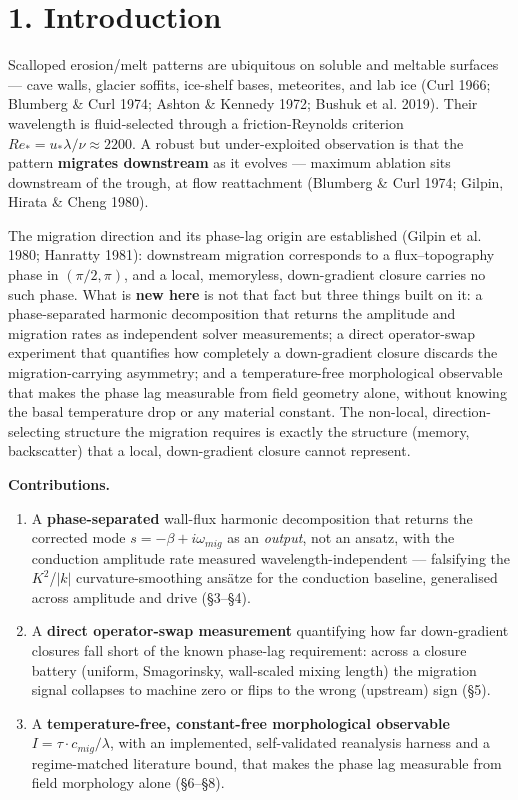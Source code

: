 \documentclass[11pt]{article}
\begin{document}
\begin{abstract}
\end{abstract}


\section*{1. Introduction}


Scalloped erosion/melt patterns are ubiquitous on soluble and meltable surfaces — cave walls, glacier soffits, ice-shelf bases, meteorites, and lab ice (Curl 1966; Blumberg \& Curl 1974; Ashton \& Kennedy 1972; Bushuk et al. 2019). Their wavelength is fluid-selected through a friction-Reynolds criterion $Re_*=u_*\lambda /\nu \approx 2200$. A robust but under-exploited observation is that the pattern \textbf{migrates downstream} as it evolves — maximum ablation sits downstream of the trough, at flow reattachment (Blumberg \& Curl 1974; Gilpin, Hirata \& Cheng 1980).


The migration direction and its phase-lag origin are established (Gilpin et al. 1980; Hanratty 1981): downstream migration corresponds to a flux–topography phase in $(\pi /2,\pi )$, and a local, memoryless, down-gradient closure carries no such phase. What is \textbf{new here} is not that fact but three things built on it: a phase-separated harmonic decomposition that returns the amplitude and migration rates as independent solver measurements; a direct operator-swap experiment that quantifies how completely a down-gradient closure discards the migration-carrying asymmetry; and a temperature-free morphological observable that makes the phase lag measurable from field geometry alone, without knowing the basal temperature drop or any material constant. The non-local, direction-selecting structure the migration requires is exactly the structure (memory, backscatter) that a local, down-gradient closure cannot represent.


\textbf{Contributions.}

\begin{enumerate}
\item A \textbf{phase-separated} wall-flux harmonic decomposition that returns the corrected mode $s=-\beta +i\omega _{mig}$ as an \emph{output}, not an ansatz, with the conduction amplitude rate measured wavelength-independent — falsifying the $K^{2}$/$|k|$ curvature-smoothing ansätze for the conduction baseline, generalised across amplitude and drive (§3–§4).
\item A \textbf{direct operator-swap measurement} quantifying how far down-gradient closures fall short of the known phase-lag requirement: across a closure battery (uniform, Smagorinsky, wall-scaled mixing length) the migration signal collapses to machine zero or flips to the wrong (upstream) sign (§5).
\item A \textbf{temperature-free, constant-free morphological observable} $I=\tau \cdot c_{mig}/\lambda $, with an implemented, self-validated reanalysis harness and a regime-matched literature bound, that makes the phase lag measurable from field morphology alone (§6–§8).
\end{enumerate}
\end{document}
